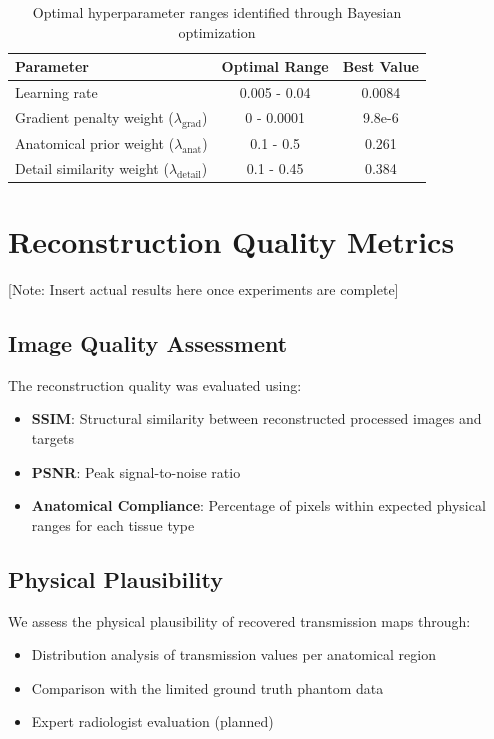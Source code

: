 \documentclass[nomenclature, english, bibtex]{kththesis}
\numberwithin{listing}{chapter}
\begin{document}
\begin{table}[ht]
\centering
\caption{Optimal hyperparameter ranges identified through Bayesian optimization}
\label{tab:hyperparameters}
\begin{tabular}{l|c|c}
\hline
\textbf{Parameter} & \textbf{Optimal Range} & \textbf{Best Value} \\
\hline
Learning rate & 0.005 - 0.04 & 0.0084 \\
Gradient penalty weight ($\lambda_{\text{grad}}$) & 0 - 0.0001 & 9.8e-6 \\
Anatomical prior weight ($\lambda_{\text{anat}}$) & 0.1 - 0.5 & 0.261 \\
Detail similarity weight ($\lambda_{\text{detail}}$) & 0.1 - 0.45 & 0.384 \\
\hline
\end{tabular}
\end{table}

\section{Reconstruction Quality Metrics}
[Note: Insert actual results here once experiments are complete]

\subsection{Image Quality Assessment}
The reconstruction quality was evaluated using:
\begin{itemize}
    \item \textbf{SSIM}: Structural similarity between reconstructed processed images and targets
    \item \textbf{PSNR}: Peak signal-to-noise ratio
    \item \textbf{Anatomical Compliance}: Percentage of pixels within expected physical ranges for each tissue type
\end{itemize}

\subsection{Physical Plausibility}
We assess the physical plausibility of recovered transmission maps through:
\begin{itemize}
    \item Distribution analysis of transmission values per anatomical region
    \item Comparison with the limited ground truth phantom data
    \item Expert radiologist evaluation (planned)
\end{itemize}
\end{document}
